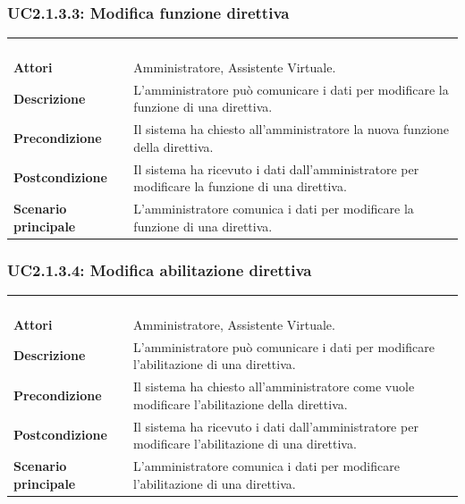 \subsubsection{UC2.1.3.3: Modifica funzione direttiva}
\label{UC2.1.3.3}
\begin{longtable}{l|p{10cm}}
\rowcolor[gray]{0.8} \multicolumn{2}{c}{} \\
\rowcolor[gray]{0.8} \multicolumn{2}{c}{\textbf{UC2.1.3.3 - Modifica funzione direttiva}} \\
\rowcolor[gray]{0.8} \multicolumn{2}{c}{} \\
\hline
&\\
\textbf{Attori} & Amministratore, Assistente Virtuale.\\[7pt]
\textbf{Descrizione} & L'amministratore può comunicare i dati per modificare la funzione di una direttiva.\\[7pt]
\textbf{Precondizione} & Il sistema ha chiesto all'amministratore la nuova funzione della direttiva.\\[7pt]
\textbf{Postcondizione} & Il sistema ha ricevuto i dati dall'amministratore per modificare la funzione di una direttiva.\\[7pt]
\textbf{Scenario principale} &L'amministratore comunica i dati per modificare la funzione di una direttiva.\\[7pt]\hline
\end{longtable}

\subsubsection{UC2.1.3.4: Modifica abilitazione direttiva}
\label{UC2.1.3.4}
\begin{longtable}{l|p{10cm}}
\rowcolor[gray]{0.8} \multicolumn{2}{c}{} \\
\rowcolor[gray]{0.8} \multicolumn{2}{c}{\textbf{UC2.1.3.4 - Modifica abilitazione direttiva}} \\
\rowcolor[gray]{0.8} \multicolumn{2}{c}{} \\
\hline
&\\
\textbf{Attori} & Amministratore, Assistente Virtuale.\\[7pt]
\textbf{Descrizione} & L'amministratore può comunicare i dati per modificare l'abilitazione di una direttiva.\\[7pt]
\textbf{Precondizione} & Il sistema ha chiesto all'amministratore come vuole modificare l'abilitazione della direttiva.\\[7pt]
\textbf{Postcondizione} & Il sistema ha ricevuto i dati dall'amministratore per modificare l'abilitazione di una direttiva.\\[7pt]
\textbf{Scenario principale} &L'amministratore comunica i dati per modificare l'abilitazione di una direttiva.\\[7pt]\hline
\end{longtable}

